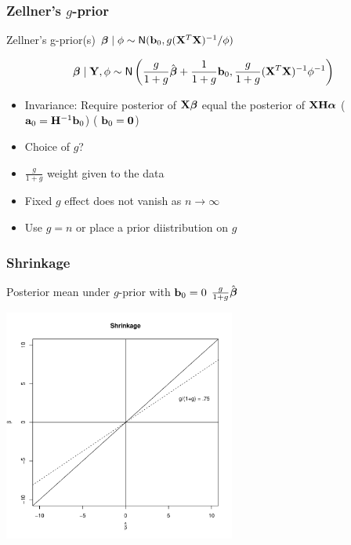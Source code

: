 \documentclass[]{beamer}
\begin{document}
\begin{frame}
  \frametitle{Zellner's $g$-prior}
Zellner's g-prior(s) $\boldsymbol{\beta} \mid \phi \sim \textsf{N}(\mathbf{b}_0, g
    (\mathbf{X}^T\mathbf{X})^{-1}/\phi)$ \pause

$$\boldsymbol{\beta} \mid \mathbf{Y}, \phi \sim \textsf{N}\left( \frac{g}{1 + g} \hat{\boldsymbol{\beta}} +  \frac{1}{1 + g}
\mathbf{b}_0, \frac{g}{1 + g} (\mathbf{X}^T\mathbf{X})^{-1} \phi^{-1} \right)$$ \pause

\begin{itemize}
\item Invariance: Require posterior of   $\mathbf{X} \boldsymbol{\beta}$  equal the posterior of $\mathbf{X} \mathbf{H} \boldsymbol{\alpha}$
\pause   ($\mathbf{a}_0 = \mathbf{H}^{-1} \mathbf{b}_0$)  (  $\mathbf{b}_0 = \mathbf{0}$)

\item Choice of $g$?  \pause
\item $\frac{g}{1 + g}$  weight given to the data \pause
\item Fixed $g$ effect does not vanish as $n \to \infty$
\item Use $g = n$ or place a prior diistribution on $g$
\end{itemize}


\end{frame}
\begin{frame}
  \frametitle{Shrinkage}
 Posterior mean under  $g$-prior  with $\mathbf{b}_0 = 0$
$\frac{g}{1 +g} \hat{\boldsymbol{\beta}} $

\centerline{\includegraphics[height=3in]{shrinkage}}
\end{frame}
\end{document}
